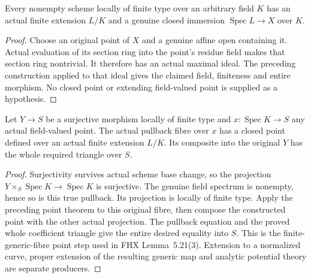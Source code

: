 \begin{theorem}
\label{scheme:actual-finite-field-point}
\leanok
Every nonempty scheme locally of finite type over an arbitrary
field $K$ has an actual finite extension $L/K$ and a genuine
closed immersion $\operatorname{Spec}L\to X$ over $K$.
\end{theorem}
\begin{proof}
Choose an original point of $X$ and a genuine affine open containing
it. Actual evaluation of its section ring into the point's residue
field makes that section ring nontrivial. It therefore has an
actual maximal ideal. The preceding construction applied to that
ideal gives the claimed field, finiteness and entire morphism.
No closed point or extending field-valued point is supplied as a
hypothesis.
\end{proof}

\begin{theorem}
\label{scheme:actual-finite-field-fibre-lift}
\leanok
Let $Y\to S$ be a surjective morphism locally of finite type and
$x:\operatorname{Spec}K\to S$ any actual field-valued point.
The actual pullback fibre over $x$ has a closed point defined over
an actual finite extension $L/K$. Its composite into the original
$Y$ has the whole required triangle over $S$.
\end{theorem}
\begin{proof}
Surjectivity survives actual scheme base change, so the projection
$Y\times_S\operatorname{Spec}K\to\operatorname{Spec}K$ is
surjective. The genuine field spectrum is nonempty, hence so is
this true pullback. Its projection is locally of finite type.
Apply the preceding point theorem to this original fibre, then
compose the constructed point with the other actual projection.
The pullback equation and the proved whole coefficient triangle
give the entire desired equality into $S$.
This is the finite-generic-fibre point step used in FHX
Lemma~5.21(3). Extension to a normalized curve, proper extension
of the resulting generic map and analytic potential theory are
separate producers.
\end{proof}
